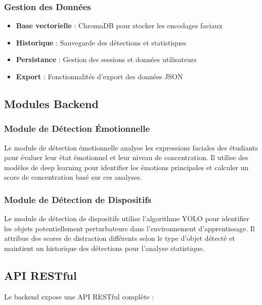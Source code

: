 \documentclass[12pt,a4paper]{article}
\begin{document}
\subsubsection{Gestion des Données}
\begin{itemize}
    \item \textbf{Base vectorielle} : ChromaDB pour stocker les encodages faciaux
    \item \textbf{Historique} : Sauvegarde des détections et statistiques
    \item \textbf{Persistance} : Gestion des sessions et données utilisateurs
    \item \textbf{Export} : Fonctionnalités d'export des données JSON
\end{itemize}

\subsection{Modules Backend}

\subsubsection{Module de Détection Émotionnelle}
Le module de détection émotionnelle analyse les expressions faciales des étudiants pour évaluer leur état émotionnel et leur niveau de concentration. Il utilise des modèles de deep learning pour identifier les émotions principales et calculer un score de concentration basé sur ces analyses.

\subsubsection{Module de Détection de Dispositifs}
Le module de détection de dispositifs utilise l'algorithme YOLO pour identifier les objets potentiellement perturbateurs dans l'environnement d'apprentissage. Il attribue des scores de distraction différents selon le type d'objet détecté et maintient un historique des détections pour l'analyse statistique.

\subsection{API RESTful}

Le backend expose une API RESTful complète :
\end{document}
